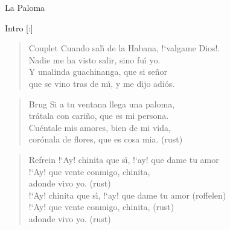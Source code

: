 \begin{song}[tango]{La Paloma}

%
%
\begin{instrumental}{Intro}
\measure{}\measure{}[:] 
\end{instrumental}

\begin{verse}{Couplet}
Cuando sal\'{\i} de la Habana, !`valgame Dios!.\\
Nadie me ha visto salir, sino fu\'{\i} yo.\\
Y unalinda guachinanga, que si se\~{n}or\\
que se vino tras de m\'{\i}, y me dijo adi\'{o}s.
\end{verse}

\begin{verse}{Brug}
Si a tu ventana llega una paloma,\\
tr\'{a}tala con cari\~{n}o, que es mi persona.\\
Cu\'{e}ntale mis amores, bien de mi vida,\\
cor\'{o}nala de flores, que es cosa mia. \hspace{3em}(rust)
\end{verse}

\begin{verse}{Refrein}
!`Ay! chinita que s\'{\i}, !`ay! que dame tu amor\\
!`Ay! que vente conmigo, chinita,\chord{}\\ %
adonde vivo yo. \hspace{3em}(rust)\\
\vspace*{1\baselineskip}
!`Ay! chinita que s\'{\i}, !`ay! que dame tu amor \hspace{1em}(roffelen)\\
!`Ay! que vente conmigo, chinita,  \hspace{5em}(rust)\\
adonde vivo yo. \hspace{3em}(rust)
\end{verse}


\end{song}

